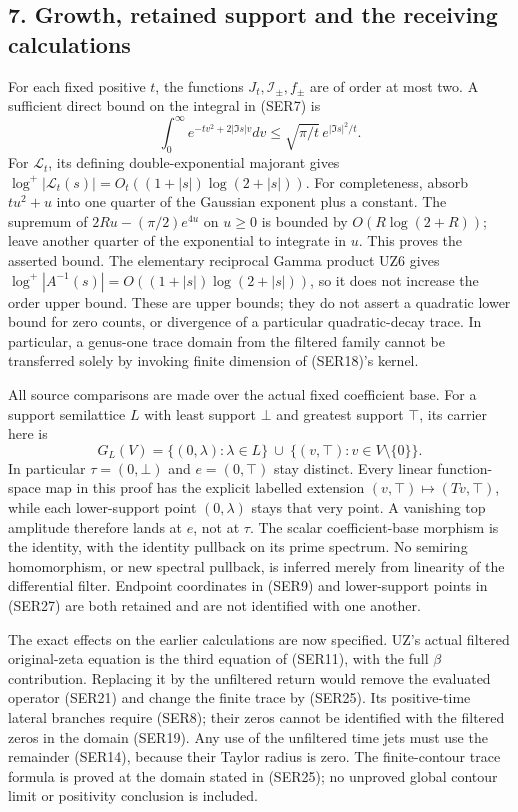 \documentclass[
  10pt,
  a4paper,
]{article}
\begin{document}
\subsection{7. Growth, retained support and the receiving
calculations}\label{growth-retained-support-and-the-receiving-calculations}

For each fixed positive \(t\), the functions
\(J_t,\mathcal I_\pm,f_\pm\) are of order at most two. A sufficient
direct bound on the integral in (SER7) is \[
\int_0^\infty e^{-tv^2+2|\Im s|v}dv
\le\sqrt{\pi/t}\,e^{|\Im s|^2/t}.
\tag{SER26}
\] For \(\mathcal L_t\), its defining double-exponential majorant gives
\(\log^+|\mathcal L_t(s)|=O_t((1+|s|)\log(2+|s|))\). For completeness,
absorb \(tu^2+u\) into one quarter of the Gaussian exponent plus a
constant. The supremum of \(2Ru-(\pi/2)e^{4u}\) on \(u\ge0\) is bounded
by \(O(R\log(2+R))\); leave another quarter of the exponential to
integrate in \(u\). This proves the asserted bound. The elementary
reciprocal Gamma product UZ6 gives
\(\log^+|A^{-1}(s)|=O((1+|s|)\log(2+|s|))\), so it does not increase the
order upper bound. These are upper bounds; they do not assert a
quadratic lower bound for zero counts, or divergence of a particular
quadratic-decay trace. In particular, a genus-one trace domain from the
filtered family cannot be transferred solely by invoking finite
dimension of (SER18)'s kernel.

All source comparisons are made over the actual fixed coefficient base.
For a support semilattice \(L\) with least support \(\bot\) and greatest
support \(\top\), its carrier here is \[
G_L(V)=\{(0,\lambda):\lambda\in L\}
\ \cup\ \{(v,\top):v\in V\setminus\{0\}\}.
\tag{SER27}
\] In particular \(\tau=(0,\bot)\) and \(e=(0,\top)\) stay distinct.
Every linear function-space map in this proof has the explicit labelled
extension \((v,\top)\mapsto(Tv,\top)\), while each lower-support point
\((0,\lambda)\) stays that very point. A vanishing top amplitude
therefore lands at \(e\), not at \(\tau\). The scalar coefficient-base
morphism is the identity, with the identity pullback on its prime
spectrum. No semiring homomorphism, or new spectral pullback, is
inferred merely from linearity of the differential filter. Endpoint
coordinates in (SER9) and lower-support points in (SER27) are both
retained and are not identified with one another.

The exact effects on the earlier calculations are now specified. UZ's
actual filtered original-zeta equation is the third equation of (SER11),
with the full \(\beta\) contribution. Replacing it by the unfiltered
return would remove the evaluated operator (SER21) and change the finite
trace by (SER25). Its positive-time lateral branches require (SER8);
their zeros cannot be identified with the filtered zeros in the domain
(SER19). Any use of the unfiltered time jets must use the remainder
(SER14), because their Taylor radius is zero. The finite-contour trace
formula is proved at the domain stated in (SER25); no unproved global
contour limit or positivity conclusion is included.
\end{document}
